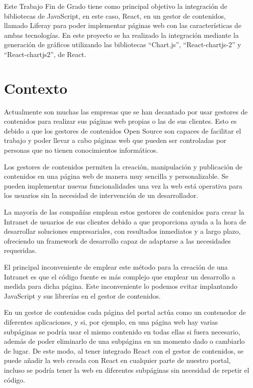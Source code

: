 \documentclass[a4paper, 12pt]{book}
\begin{document}
Este Trabajo Fin de Grado tiene como principal objetivo la integración de bibliotecas de JavaScript, en este caso, React, en un gestor de contenidos, llamado Liferay para poder implementar páginas web con las características de ambas tecnologías. En este proyecto se ha realizado la integración mediante la generación de gráficos utilizando las bibliotecas “Chart.js”, “React-chartjs-2” y “React-chartjs2”, de React.


\section{Contexto}
\label{sec:contexto}
Actualmente son muchas las empresas que se han decantado por usar gestores de contenidos para realizar sus páginas web propias o las de sus clientes. Esto es debido a que los gestores de contenidos Open Source son capaces de facilitar el trabajo y poder llevar a cabo páginas web que pueden ser controladas por personas que no tienen conocimientos informáticos.

\vspace{5mm} %
Los gestores de contenidos permiten la creación, manipulación y publicación de contenidos en una página web de manera muy sencilla y personalizable. Se pueden implementar nuevas funcionalidades una vez la web está operativa para los usuarios sin la necesidad de intervención de un desarrollador.

\vspace{5mm} %
La mayoría de las compañías emplean estos gestores de contenidos para crear la Intranet de usuarios de sus clientes debido a que proporciona ayuda a la hora de desarrollar soluciones empresariales, con resultados inmediatos y a largo plazo, ofreciendo un framework de desarrollo capaz de adaptarse a las necesidades requeridas.

\vspace{5mm} %
El principal inconveniente de emplear este método para la creación de una Intranet es que el código fuente es más complejo que emplear un desarrollo a medida para dicha página. Este inconveniente lo podemos evitar implantando JavaScript y sus librerías en el gestor de contenidos. 

\vspace{5mm} %
En un gestor de contenidos cada página del portal actúa como un contenedor de diferentes aplicaciones, y si, por ejemplo, en una página web hay varias subpáginas se podría usar el mismo contenido en todas ellas si fuera necesario,  además de poder eliminarlo de una subpágina en un momento dado o cambiarlo de lugar. De este modo, al tener integrado React con el gestor de contenidos, se puede añadir la web creada con React en cualquier parte de nuestro portal, incluso se podría tener la web en diferentes subpáginas sin necesidad de repetir el código.
\end{document}
